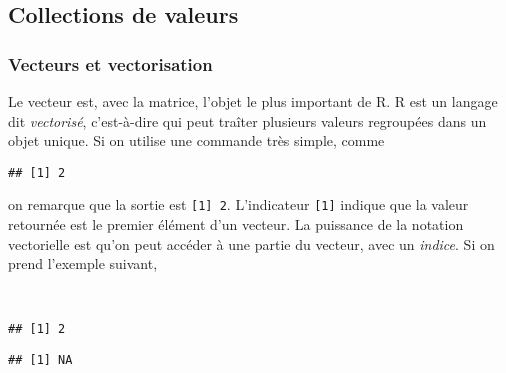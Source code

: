 \subsection{Collections de valeurs}

\subsubsection{Vecteurs et vectorisation}

Le vecteur est, avec la matrice, l'objet le plus important de R.
R est un langage dit \emph{vectorisé}, c'est-à-dire qui peut traîter plusieurs valeurs regroupées dans un objet unique.
Si on utilise une commande très simple, comme

\begin{knitrout}
\color{fgcolor}\begin{kframe}
\begin{flushleft}
\ttfamily\noindent
{}\mbox{}
\normalfont
\end{flushleft}
\begin{verbatim}
## [1] 2
\end{verbatim}
\end{kframe}
\end{knitrout}


\noindent on remarque que la sortie est \texttt{[1] 2}.
L'indicateur \texttt{[1]} indique que la valeur retournée est le premier élément d'un vecteur.
La puissance de la notation vectorielle est qu'on peut accéder à une partie du vecteur, avec un \emph{indice}.
Si on prend l'exemple suivant,

\begin{knitrout}
\color{fgcolor}\begin{kframe}
\begin{flushleft}
\ttfamily\noindent
{}\hlassignement{=}{\ }\hspace*{\fill}\\
\hlstd{}\hlkeyword{[}\hlkeyword{]}\mbox{}
\normalfont
\end{flushleft}
\begin{verbatim}
## [1] 2
\end{verbatim}
\begin{flushleft}
\ttfamily\noindent
{}\hlkeyword{[}\hlkeyword{]}\mbox{}
\normalfont
\end{flushleft}
\begin{verbatim}
## [1] NA
\end{verbatim}
\end{kframe}
\end{knitrout}



